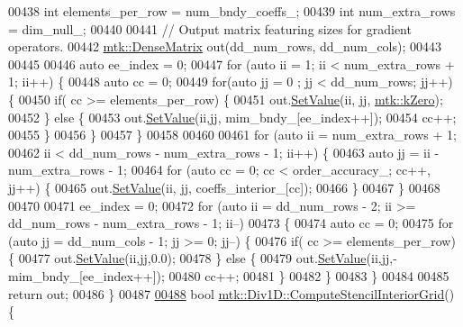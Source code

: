 \begin{DoxyCode}
{{00438   \textcolor{keywordtype}{int} elements\_per\_row = num\_bndy\_coeffs\_;
00439   \textcolor{keywordtype}{int} num\_extra\_rows = dim\_null\_;
00440 
00441   \textcolor{comment}{// Output matrix featuring sizes for gradient operators.}
00442   \hyperlink{classmtk_1_1DenseMatrix}{mtk::DenseMatrix} out(dd\_num\_rows, dd\_num\_cols);
00443 
00445 
00446   \textcolor{keyword}{auto} ee\_index = 0;
00447   \textcolor{keywordflow}{for} (\textcolor{keyword}{auto} ii = 1; ii < num\_extra\_rows + 1; ii++) \{
00448     \textcolor{keyword}{auto} cc = 0;
00449     \textcolor{keywordflow}{for}(\textcolor{keyword}{auto} jj = 0 ; jj < dd\_num\_rows; jj++) \{
00450       \textcolor{keywordflow}{if}( cc >= elements\_per\_row) \{
00451         out.\hyperlink{classmtk_1_1DenseMatrix_a784ce5784109ac86bfb9d8562b334b13}{SetValue}(ii, jj, \hyperlink{group__c01-roots_ga59a451a5fae30d59649bcda274fea271}{mtk::kZero});
00452       \} \textcolor{keywordflow}{else} \{
00453         out.\hyperlink{classmtk_1_1DenseMatrix_a784ce5784109ac86bfb9d8562b334b13}{SetValue}(ii,jj, mim\_bndy\_[ee\_index++]);
00454         cc++;
00455       \}
00456     \}
00457   \}
00458 
00460 
00461   \textcolor{keywordflow}{for} (\textcolor{keyword}{auto} ii = num\_extra\_rows + 1;
00462        ii < dd\_num\_rows - num\_extra\_rows - 1; ii++) \{
00463     \textcolor{keyword}{auto} jj = ii - num\_extra\_rows - 1;
00464     \textcolor{keywordflow}{for} (\textcolor{keyword}{auto} cc = 0; cc < order\_accuracy\_; cc++, jj++) \{
00465       out.\hyperlink{classmtk_1_1DenseMatrix_a784ce5784109ac86bfb9d8562b334b13}{SetValue}(ii, jj, coeffs\_interior\_[cc]);
00466     \}
00467   \}
00468 
00470 
00471   ee\_index = 0;
00472   \textcolor{keywordflow}{for} (\textcolor{keyword}{auto} ii = dd\_num\_rows - 2; ii >= dd\_num\_rows - num\_extra\_rows - 1; ii--)
00473   \{
00474     \textcolor{keyword}{auto} cc = 0;
00475     \textcolor{keywordflow}{for} (\textcolor{keyword}{auto} jj = dd\_num\_cols - 1; jj >= 0; jj--) \{
00476       \textcolor{keywordflow}{if}( cc >= elements\_per\_row) \{
00477         out.\hyperlink{classmtk_1_1DenseMatrix_a784ce5784109ac86bfb9d8562b334b13}{SetValue}(ii,jj,0.0);
00478       \} \textcolor{keywordflow}{else} \{
00479         out.\hyperlink{classmtk_1_1DenseMatrix_a784ce5784109ac86bfb9d8562b334b13}{SetValue}(ii,jj,-mim\_bndy\_[ee\_index++]);
00480         cc++;
00481       \}
00482      \}
00483   \}
00484 
00485   \textcolor{keywordflow}{return} out;
00486 \}
00487 
\hypertarget{mtk__div__1d_8cc_source_l00488}{}\hyperlink{classmtk_1_1Div1D_a3eb3a32862a6b066cd583cbbd00a6509}{00488} \textcolor{keywordtype}{bool} \hyperlink{classmtk_1_1Div1D_a3eb3a32862a6b066cd583cbbd00a6509}{mtk::Div1D::ComputeStencilInteriorGrid}() \{
}}
\end{DoxyCode}
